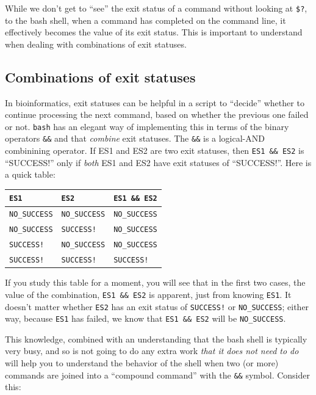 \documentclass[]{krantz}
\begin{document}
While we don't get to ``see'' the exit status of a command without
looking at \texttt{\$?}, to the bash shell, when a command has completed
on the command line, it effectively becomes the value of its exit
status. This is important to understand when dealing with combinations
of exit statuses.

\hypertarget{combinations-of-exit-statuses}{%
\subsection{Combinations of exit statuses}\label{combinations-of-exit-statuses}}

In bioinformatics, exit statuses can be helpful in a script to ``decide'' whether
to continue processing the next command, based on whether the previous one
failed or not. \texttt{bash} has an elegant way of implementing this in terms of
the binary operators \texttt{\&\&} and \texttt{\textbar{}\textbar{}} that \emph{combine} exit statuses. The \texttt{\&\&} is
a logical-AND combinining operator. If ES1 and ES2 are two exit statuses, then
\texttt{ES1\ \&\&\ ES2} is ``SUCCESS!'' only if \emph{both} ES1 and ES2 have exit statuses of
``SUCCESS!''. Here is a quick table:

\begin{longtable}[]{@{}lll@{}}
\toprule
\texttt{ES1} & \texttt{ES2} & \texttt{ES1\ \&\&\ ES2}\tabularnewline
\midrule
\endhead
\texttt{NO\_SUCCESS} & \texttt{NO\_SUCCESS} & \texttt{NO\_SUCCESS}\tabularnewline
\texttt{NO\_SUCCESS} & \texttt{SUCCESS!} & \texttt{NO\_SUCCESS}\tabularnewline
\texttt{SUCCESS!} & \texttt{NO\_SUCCESS} & \texttt{NO\_SUCCESS}\tabularnewline
\texttt{SUCCESS!} & \texttt{SUCCESS!} & \texttt{SUCCESS!}\tabularnewline
\bottomrule
\end{longtable}

If you study this table for a moment, you will see that
in the first two cases, the value of the combination,
\texttt{ES1\ \&\&\ ES2} is apparent, just from knowing \texttt{ES1}. It
doesn't matter whether \texttt{ES2} has an exit status
of \texttt{SUCCESS!} or \texttt{NO\_SUCCESS}; either way, because
\texttt{ES1} has failed, we know that \texttt{ES1\ \&\&\ ES2} will be
\texttt{NO\_SUCCESS}.

This knowledge, combined with an understanding that
the bash shell is typically very busy, and so is not going to
do any extra work \emph{that it does not need to do} will help you
to understand the behavior of the shell when two (or more)
commands are joined into a ``compound command'' with the \texttt{\&\&} symbol.
Consider this:
\end{document}
